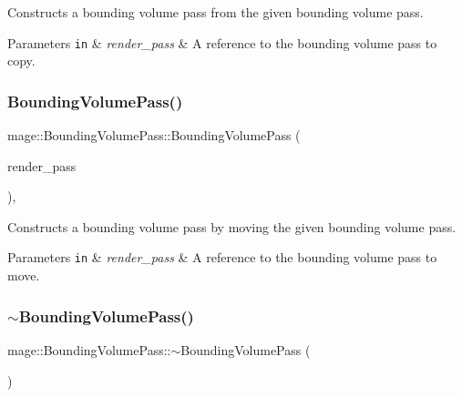 Constructs a bounding volume pass from the given bounding volume pass.


\begin{DoxyParams}[1]{Parameters}
\mbox{\tt in}  & {\em render\+\_\+pass} & A reference to the bounding volume pass to copy. \\
\hline
\end{DoxyParams}
\hypertarget{classmage_1_1_bounding_volume_pass_a569c5b210bb1135771970ef7ac70c210}{}\label{classmage_1_1_bounding_volume_pass_a569c5b210bb1135771970ef7ac70c210} 
\subsubsection{\texorpdfstring{Bounding\+Volume\+Pass()}{BoundingVolumePass()}\hspace{0.1cm}{\footnotesize\ttfamily [3/3]}}
{\footnotesize\ttfamily mage\+::\+Bounding\+Volume\+Pass\+::\+Bounding\+Volume\+Pass (\begin{DoxyParamCaption}\item[{\hyperlink{classmage_1_1_bounding_volume_pass}{Bounding\+Volume\+Pass} \&\&}]{render\+\_\+pass }\end{DoxyParamCaption})\hspace{0.3cm}{\ttfamily [default]}, {\ttfamily [noexcept]}}

Constructs a bounding volume pass by moving the given bounding volume pass.


\begin{DoxyParams}[1]{Parameters}
\mbox{\tt in}  & {\em render\+\_\+pass} & A reference to the bounding volume pass to move. \\
\hline
\end{DoxyParams}
\hypertarget{classmage_1_1_bounding_volume_pass_a41dc433aed26f05e8b60462a6e337509}{}\label{classmage_1_1_bounding_volume_pass_a41dc433aed26f05e8b60462a6e337509} 
\subsubsection{\texorpdfstring{$\sim$\+Bounding\+Volume\+Pass()}{~BoundingVolumePass()}}
{\footnotesize\ttfamily mage\+::\+Bounding\+Volume\+Pass\+::$\sim$\+Bounding\+Volume\+Pass (\begin{DoxyParamCaption}{ }\end{DoxyParamCaption})\hspace{0.3cm}{\ttfamily [default]}}

